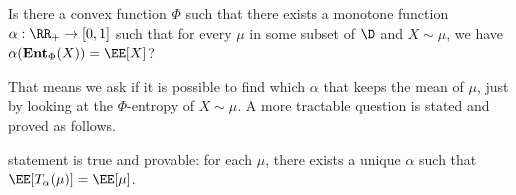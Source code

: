 \begin{openquestion}
  \label{openq:entropy}
  Is there a convex function $\Phi$ such that there exists a monotone function $\alpha: \RR_+ \to [0,1]$ such that for every $\mu$ in some subset of $\D$ and $X\sim \mu$, we have $\alpha(\textbf{Ent}_{\Phi}(X)) = \EE[X]$?
\end{openquestion}

That means we ask if it is possible to find which $\alpha$ that keeps the mean of $\mu$, just by looking at the $\Phi$-entropy of $X\sim\mu$. A more tractable question is stated and proved as follows.

statement is true and provable: for each $\mu$, there exists a unique $\alpha$ such that $\EE[T_\alpha(\mu)] = \EE[\mu]$.
